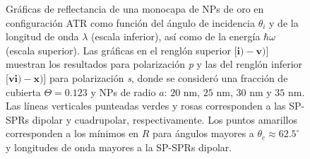 \begin{figure}[b!]\centering
{}\vspace*{-.5em}
	\caption{Gráficas de reflectancia de una monocapa de NPs de oro en configuración ATR como función del ángulo de incidencia $\theta_i$ y de la longitud de onda $\lambda$ (escala inferior), así como de la energía  $\hbar\omega$ (escala superior).  Las gráficas   en el renglón superior [$\mathbf{i)-v)}$] muestran los resultados para  polarización \emph{p} y las del renglón inferior  [$\mathbf{vi)-x)}$]  para polarización  \emph{s}, donde se consideró una fracción de cubierta $\Theta = 0.123$ y  NPs de radio  $a$: $20$ nm, $25$ nm, $30$ nm y $35$ nm.  Las líneas verticales punteadas verdes y rosas corresponden a las SP-SPRs dipolar y  cuadrupolar, respectivamente.  Los puntos amarillos corresponden a los mínimos en $R$ para ángulos mayores a $\theta_c\approx 62.5^\circ$ y longitudes de onda mayores a la SP-SPRs dipolar.
}	\label{fig:Au-R-Rad}	
	\end{figure}	

